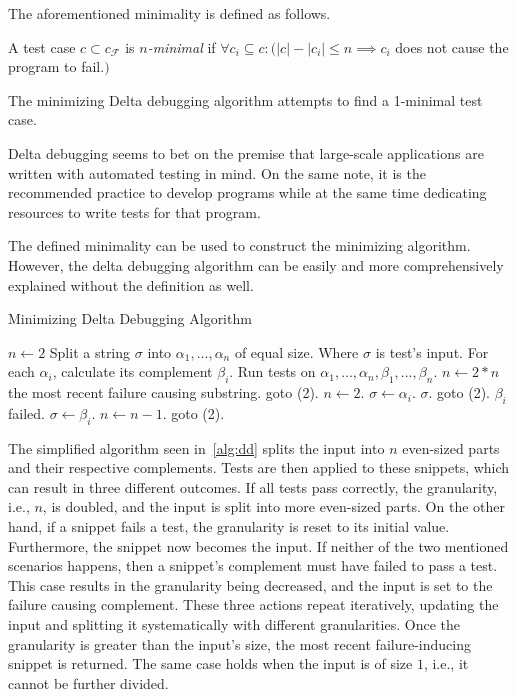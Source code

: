 The aforementioned minimality is defined as follows.

\begin{defn}[$n$-minimality]\label{def02:4}
  A test case $c \subset c_\mathcal{F}$ is \emph{$n$-minimal}
  if $\forall c_i \subseteq c:
  (|c| - |c_i| \leq n \implies c_i$ does not cause the program to fail.$)$
\end{defn}

The minimizing Delta debugging algorithm attempts to find a 1-minimal test case.

Delta debugging seems to bet on the premise that large-scale applications are written
with automated testing in mind. On the same note, it is the recommended practice to
develop programs while at the same time dedicating resources to write tests for that
program.

The defined minimality can be used to construct the minimizing algorithm. 
However, the delta debugging algorithm can be easily and more comprehensively explained 
without the definition as well.


\begin{algorithm}
	\label{alg:dd}
	\caption{Minimizing Delta Debugging Algorithm} 
	\begin{algorithmic}[1]
		\State $n \leftarrow 2$
		\State Split a string $\sigma$ into $\alpha_1,\dots,\alpha_n$ of equal size.
		\Comment Where $\sigma$ is test's input.
		\State For each $\alpha_i$, calculate its complement $\beta_i$.
		\State Run tests on $\alpha_1,\dots,\alpha_n,\beta_1,\dots,\beta_n$.
			\State $n \leftarrow 2*n$
				\Return the most recent failure causing substring.
			\Else
				\State goto (2).
			\EndIf
			\State $n \leftarrow 2$.
			\State $\sigma \leftarrow \alpha_i$.
				\Return $\sigma$.
			\Else
				\State goto (2).
			\EndIf
		\Else
			\Comment $\beta_i$ failed.
			\State $\sigma \leftarrow \beta_i$.
			\State $n \leftarrow n - 1$.
			\State goto (2).
		\EndIf
	\end{algorithmic} 
\end{algorithm}

The simplified algorithm seen in~\ref{alg:dd} splits the input into $n$ even-sized
parts and their respective complements. 
Tests are then applied to these snippets, which can result in three different outcomes. 
If all tests pass correctly, the granularity, i.e., $n$, is doubled, and the input is split
into more even-sized parts. 
On the other hand, if a snippet fails a test, the granularity is reset to its initial value.
Furthermore, the snippet now becomes the input. 
If neither of the two mentioned scenarios happens, 
then a snippet's complement must have failed to pass a test. 
This case results in the granularity being decreased, 
and the input is set to the failure causing complement.
These three actions repeat iteratively, updating the input and 
splitting it systematically with different granularities. 
Once the granularity is greater than the input's size, 
the most recent failure-inducing snippet is returned. 
The same case holds when the input is of size $1$, i.e., it cannot be further divided.

